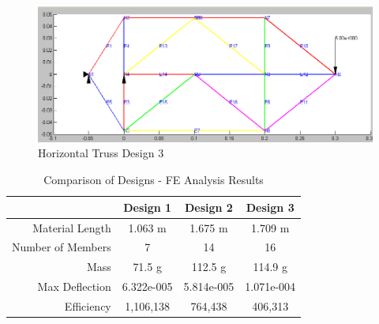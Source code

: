 \begin{figure}[p]
    \centering
    \includegraphics[width=.8\textwidth]{images/horizontal3}
    \caption{Horizontal Truss Design 3}
    \label{fig:hz3}
\end{figure}

\begin{table}[p]
	\centering
	\caption{Comparison of Designs - FE Analysis Results}
	\label{tbl:results}
	\vspace{6pt}
	\begin{tabular}{rccc}
		\toprule
		& Design 1 & Design 2 & Design 3 \\
		\midrule
		Material Length & 1.063 m & 1.675 m & 1.709 m \\
		Number of Members & 7 & 14 & 16 \\
		Mass & 71.5 g & 112.5 g & 114.9 g \\
		Max Deflection & 6.322e-005 & 5.814e-005 & 1.071e-004   \\
		Efficiency & 1,106,138 & 764,438 & 406,313 \\
		\bottomrule
	\end{tabular}
\end{table}